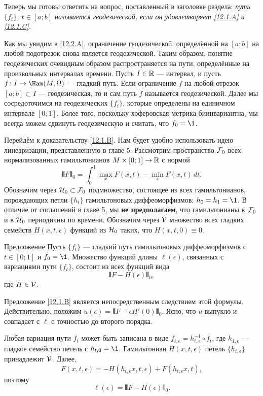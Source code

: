 Теперь мы готовы ответить на вопрос, поставленный в заголовке раздела:
\emph{путь $\{f_t\}$, $t\in[a; b]$ называется
  геодезической, если он удовлетворяет \ref{12.1.A} и \ref{12.1.C}.} 

Как мы увидим в \ref{12.2.A}, ограничение геодезической, определённой
на $[a; b]$ на любой подотрезок снова является геодезической. 
Таким образом, понятие геодезических очевидным образом
распространяется на пути, определённые на произвольных интервалах
времени. 
Пусть $I\in \mathbb{R}$ — интервал, и пусть $f\: I\to\Ham(M,\Omega)$ — гладкий путь.
Если ограничение $f$ на любой отрезок $[a; b] \subset I$ —
геодезическая, то и сам путь $f$ называется геодезической. 
Далее мы сосредоточимся на геодезических $\{f_t\}$, которые определены
на единичном интервале $[0; 1]$. 
Более того, поскольку хоферовская метрика биинвариантна, мы всегда
можем сдвинуть геодезическую и считать, что $f_0 = \1$.  

Перейдём к доказательству \ref{12.1.B}.
Нам будет удобно использовать идею линеаризации, представленную в главе 5.
Рассмотрим пространство $\mathcal{F}_0$ всех нормализованных гамильтонианов $M \times [0; 1] \to \mathbb{R}$ с нормой 
\[\VERT F \VERT_0 = \int_0^1 \max_x F(x,t) - \min_x F(x,t)\, dt.\]
Обозначим через $\mathcal{H}_0 \subset \mathcal{F}_0$ подмножество,
состоящее из всех гамильтонианов, порождающих петли $\{h_t\}$
гамильтоновых диффеоморфизмов: $h_0 = h_1 = \1$.
В отличие от соглашений в главе 5,
мы \textbf{не предполагаем}, что гамильтонианы в $\mathcal{F}_0$ и в $\mathcal{H}_0$
периодичны по времени. 
Обозначим через \index[symb]{$\V$}$\V$ множество всех гладких семейств
$H(x, t, \epsilon)$ функций из $\mathcal{H}_0$ таких, что $H(x, t, 0) \equiv
0$. 

\begin{thm}{Предложение}\label{12.1.E}
Пусть $\{f_t\}$ — гладкий путь гамильтоновых диффеоморфизмов с $t
\in [0; 1]$ и $f_0 = \1$. 
Множество функций длины $\ell(\epsilon)$, связанных с вариациями пути $\{f_t\}$, состоит из всех функций вида 
\[\VERT F - H(\epsilon)\VERT_0,\]
где $H\in\mathcal{V}$.
\end{thm}

Предложение \ref{12.1.B} является непосредственным следствием этой формулы.
Действительно, положим $u(\epsilon) = \VERT F - \epsilon H'(0)\VERT_0$.
Ясно, что $u$ выпукло и совпадает с $\ell$ с точностью до второго порядка.

Любая вариация пути $f_t$ может быть записана в виде $f_{t,\epsilon} = h_{t,\epsilon}^{-1}\circ f_t$, где $h_{1,\epsilon}$ — гладкое семейство петель с $h_{t,0} = \1$.
Гамильтониан $H(x,t,\epsilon)$ петель $\{h_{t,\epsilon}\}$ принадлежит $\V$.
Далее, 
\[F(x, t, \epsilon) = -H(h_{t,\epsilon}x, t, \epsilon) + F(h_{t,\epsilon}x, t),\]
поэтому
\[\ell(\epsilon) = \VERT F - H(\epsilon)\VERT_0.\]
\qeds

